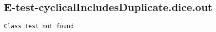 \subsection{E-test-cyclicalIncludesDuplicate.dice.out}
\begin{verbatim}
Class test not found

\end{verbatim}